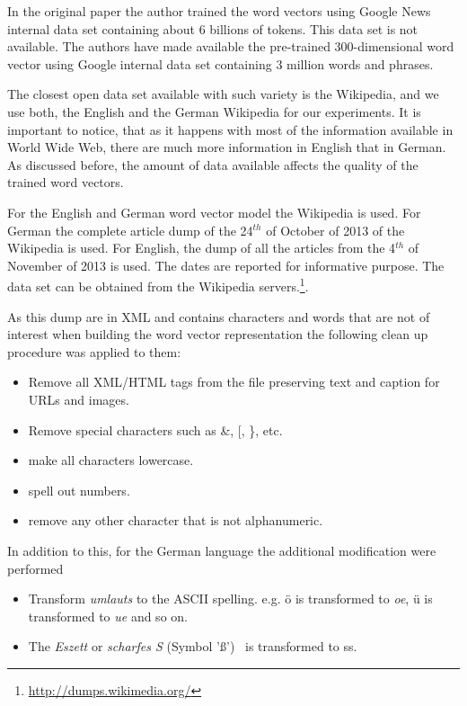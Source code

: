 In the original paper \cite{DBLP:journals/corr/abs-1301-3781} the author
trained the word vectors using Google News internal data set containing about
6 billions of tokens. This data set is not available. The authors have made
available the pre-trained 300-dimensional  word vector  using Google internal
data set containing 3 million words and phrases.

The closest open data set available with such variety is the Wikipedia, and
we use both, the English and the German Wikipedia for our experiments.  It is
important to notice, that as it happens with most of the information
available in World Wide Web, there are much more information in English that
in German.  As discussed before, the amount of data available affects the quality  of the trained
word vectors. 

For the English and German word vector model  the Wikipedia is used. For
German the complete article dump of the 24$^{th}$ of October of 2013  of the
Wikipedia is used.  For English, the dump of all the articles from the
4$^{th}$ of November of 2013 is used. The dates are reported for informative
purpose. The data set can be obtained from the Wikipedia
servers.\footnote{\url{http://dumps.wikimedia.org/}}.

As this dump are in XML and contains characters and words that are not of
interest when building the word vector  representation the following clean up
procedure was applied to them:

\begin{itemize}
\item Remove all XML/HTML tags from the file preserving text and caption for
 URLs and images.
\item Remove special characters such as \&,  [, \}, etc.
\item make all characters lowercase.
\item spell out numbers.
\item remove any other character that is not alphanumeric.
\end{itemize}

In addition to this, for the German language the additional modification were
performed
\begin{itemize}
\item Transform \textit{umlauts} to the ASCII spelling.  e.g. \"{o} is
  transformed to \textit{oe},  \"{u} is transformed to \textit{ue}  and so
  on. 
\item The \textit{Eszett} or \textit{scharfes S} (Symbol '\ss') \  is transformed to ss.
\end{itemize}

